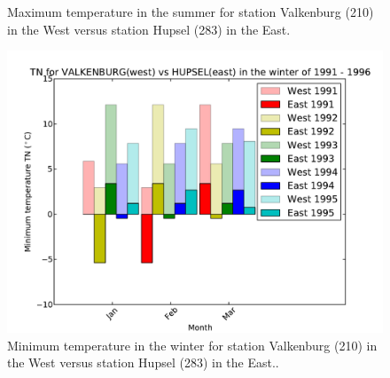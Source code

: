 \documentclass[a4paper]{article}
\begin{document}
\begin{enumerate}
\begin{figure}[h!]
\begin{center}
\caption{Maximum temperature in the summer for station Valkenburg (210) in the West versus station Hupsel (283) in the East.\label{fig:summer}}
\end{center} 
\end{figure} 

\begin{figure}[h!] 
\begin{center} 
\includegraphics[scale=0.5]{../Week3/BLAC_hw5_TLRH_6126561_210vs283_TN_winter_1991.pdf} 
\caption{Minimum temperature in the winter for station Valkenburg (210) in the West versus station Hupsel (283) in the East..\label{fig:winter}}
\end{center} 
\end{figure} 

\end{enumerate}

\newpage




\end{document}
